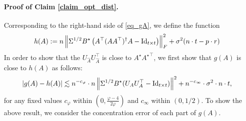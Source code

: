 	
	\iffalse
	Second, notice that
	\begin{align*}
			\exarg{\cE}{\cE A^{\top} (AA^{\top})^{+} A \cE^{\top}}
		&= \exarg{\cE}{\sum_{j=1}^t \sum_{k=1}^t \varepsilon^{(j)} A_j^{\top} (AA^{\top})^{+} A_k {\varepsilon^{(k)}}^{\top}} \\
		&= \exarg{\cE}{\sum_{j=1}^t \varepsilon^{(j)} A_j^{\top} (AA^{\top})^{+} A_j {\varepsilon^{(j)}}^{\top}} \\
		&= \sigma^2 \cdot r \cdot \id_{n\times n}.
	\end{align*}
	In the above derivation, the second step used the fact that for any $j\neq k$, $\varepsilon^{(j)}$ and $\varepsilon^{(k)}$ are pairwise independent.
	The third step used the fact that $\sum_{j=1}^t A_j^{\top} (AA^{\top})^{+} A_j = \bigtr{\id_{r\times r}} = r$, and $\ex{\varepsilon^{(j)} {\varepsilon^{(j)}}^{\top}} = \sigma^2 \cdot \id_{n\times n}$.
	Therefore, we have that
	\begin{align*}
		\exarg{\cE}{ \inner{\cW A}{\cE}} = \sigma^2 \cdot r \cdot \bigtr{X(X^{\top} X)^{-1} X^{\top}} =  \sigma^2 \cdot r \cdot \bigtr{ X^{\top}X(X^{\top} X)^{-1}}  = \sigma^2 \cdot r \cdot p.
	\end{align*}
   because $X^\top X$ is a $p\times p$ matrix.	
	Hence the proof is complete.
\fi

	\paragraph{Proof of Claim \ref{claim_opt_dist}.}
	Corresponding to the right-hand side of \eqref{eq_gA}, we define the function
	$$h(A):= n \left\| \Sigma^{1/2} B^{\star} \left({A^{\top} (AA^{\top})^{\dagger} A - \operatorname{Id}_{t\times t}}\right) \right\|_{F}^2 + \sigma^2 (n\cdot t - p \cdot r)$$
	In order to show that the $U_{\hat{A}}U_{\hat{A}}^\top$ is close to $A^\star {A^\star}^\top$, we first show that $g(A)$ is close to $h(A)$ as follows:
	\begin{align}\label{eq_gA_err}
		{\left| {g(A) - h(A)} \right|} \lesssim  n^{-c_{\varphi}} \cdot n \left\| \Sigma^{1/2} B^{\star} (U_AU_A^{\top} - \operatorname{Id}_{t\times t}) \right\|^2 + n^{-c_{\infty}} \cdot \sigma^2 \cdot n \cdot t,
	\end{align}
	for any fixed values $c_{\varphi}$ within $(0, \frac{\varphi-4}{2\varphi})$ and $c_{\infty}$ within $(0, 1/2)$. 
	To show the above result, we consider the concentration error of each part of $g(A)$.

